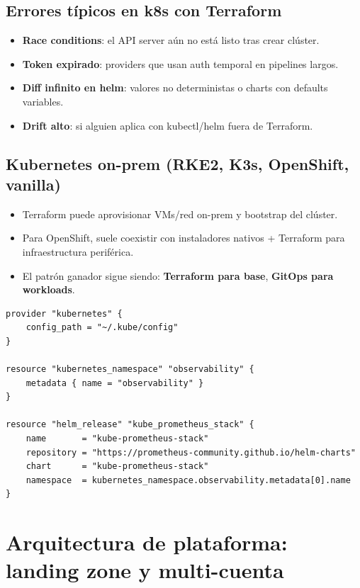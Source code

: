 \documentclass[12pt,a4paper]{article}
\begin{document}
\subsection{Errores típicos en k8s con Terraform}
\begin{itemize}
		\item \textbf{Race conditions}: el API server aún no está listo tras crear clúster.
		\item \textbf{Token expirado}: providers que usan auth temporal en pipelines largos.
		\item \textbf{Diff infinito en helm}: valores no deterministas o charts con defaults variables.
		\item \textbf{Drift alto}: si alguien aplica con kubectl/helm fuera de Terraform.
\end{itemize}

\subsection{Kubernetes on-prem (RKE2, K3s, OpenShift, vanilla)}
\begin{itemize}
	\item Terraform puede aprovisionar VMs/red on-prem y bootstrap del clúster.
	\item Para OpenShift, suele coexistir con instaladores nativos + Terraform para infraestructura periférica.
	\item El patrón ganador sigue siendo: \textbf{Terraform para base}, \textbf{GitOps para workloads}.
\end{itemize}

\begin{lstlisting}[caption=Patrón on-prem k8s: namespaces base + helm add-ons]
provider "kubernetes" {
	config_path = "~/.kube/config"
}

resource "kubernetes_namespace" "observability" {
	metadata { name = "observability" }
}

resource "helm_release" "kube_prometheus_stack" {
	name       = "kube-prometheus-stack"
	repository = "https://prometheus-community.github.io/helm-charts"
	chart      = "kube-prometheus-stack"
	namespace  = kubernetes_namespace.observability.metadata[0].name
}
\end{lstlisting}

\section{Arquitectura de plataforma: landing zone y multi-cuenta}
\end{document}
